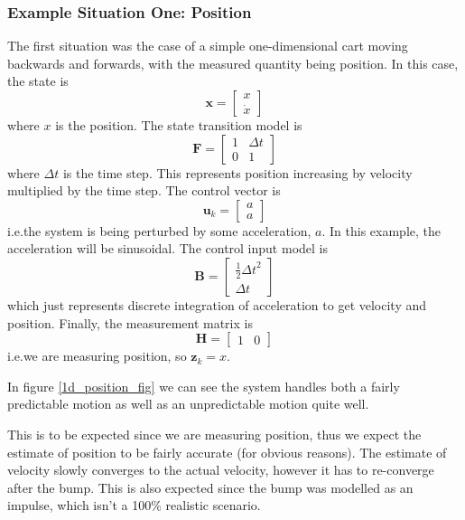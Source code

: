 \documentclass[12pt]{article}
\begin{document}
\subsubsection{Example Situation One: Position}
The first situation was the case of a simple one-dimensional cart moving backwards and forwards, with the measured quantity being position. In this case, the state is
$$\mathbf{x} = \begin{bmatrix} x \\ \dot{x} \end{bmatrix}$$
where $x$ is the position. The state transition model is
$$\mathbf{F} = \begin{bmatrix} 1 & \Delta t \\ 0 & 1 \end{bmatrix}$$
where $\Delta t$ is the time step. This represents position increasing by velocity multiplied by the time step. The control vector is
$$\mathbf{u}_k = \begin{bmatrix} a \\a\end{bmatrix}$$
i.e.\@ the system is being perturbed by some acceleration, $a$. In this example, the acceleration will be sinusoidal. The control input model is 
$$\mathbf{B} = \begin{bmatrix} \frac{1}{2} {\Delta t}^2 \\ \Delta t \end{bmatrix}$$
which just represents discrete integration of acceleration to get velocity and position. Finally, the measurement matrix is
$$\mathbf{H} = \begin{bmatrix} 1 & 0 \end{bmatrix}$$
i.e.\@ we are measuring position, so $\mathbf{z}_k=x$.

In figure \ref{1d_position_fig} we can see the system handles both a fairly predictable motion as well as an unpredictable motion quite well. 

This is to be expected since we are measuring position, thus we expect the estimate of position to be fairly accurate (for obvious reasons). The estimate of velocity slowly converges to the actual velocity, however it has to re-converge after the bump. This is also expected since the bump was modelled as an impulse, which isn't a 100\% realistic scenario.
\end{document}
